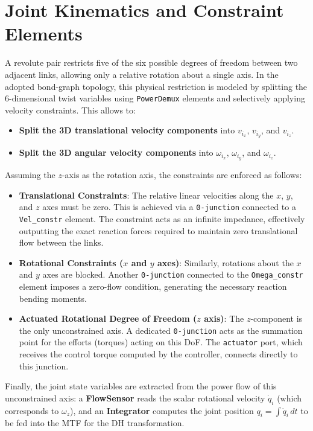 \section{Joint Kinematics and Constraint Elements}

A revolute pair restricts five of the six possible degrees of freedom between two adjacent links, allowing only a relative rotation about a single axis. In the adopted bond-graph topology, this physical restriction is modeled by splitting the 6-dimensional twist variables using \texttt{PowerDemux} elements and selectively applying velocity constraints. This allows to:
\begin{itemize}
  \item \textbf{Split the 3D translational velocity components} into $v_{i_x}$, $v_{i_y}$, and $v_{i_z}$.
  \item \textbf{Split the 3D angular velocity components} into $\omega_{i_x}$, $\omega_{i_y}$, and $\omega_{i_z}$.
\end{itemize}

Assuming the $z$-axis as the rotation axis, the constraints are enforced as follows:
\begin{itemize}
  \item \textbf{Translational Constraints}: The relative linear velocities along the $x$, $y$, and $z$ axes must be zero. This is achieved via a \texttt{0-junction} connected to a \texttt{Vel\_constr} element. The constraint acts as an infinite impedance, effectively outputting the exact reaction forces required to maintain zero translational flow between the links.
  \item \textbf{Rotational Constraints ($x$ and $y$ axes)}: Similarly, rotations about the $x$ and $y$ axes are blocked. Another \texttt{0-junction} connected to the \texttt{Omega\_constr} element imposes a zero-flow condition, generating the necessary reaction bending moments.
  \item \textbf{Actuated Rotational Degree of Freedom ($z$ axis)}: The $z$-component is the only unconstrained axis. A dedicated \texttt{0-junction} acts as the summation point for the efforts (torques) acting on this DoF. The \texttt{actuator} port, which receives the control torque computed by the controller, connects directly to this junction.
\end{itemize}

Finally, the joint state variables are extracted from the power flow of this unconstrained axis: a \textbf{FlowSensor} reads the scalar rotational velocity $\dot{q}_i$ (which corresponds to $\omega_z$), and an \textbf{Integrator} computes the joint position $q_i = \int \dot{q}_i\,dt$ to be fed into the MTF for the DH transformation.


